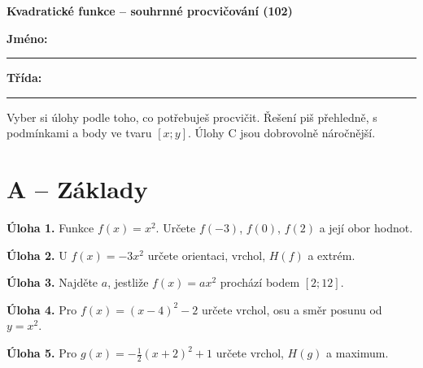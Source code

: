 \documentclass[11pt,a4paper]{article}
\begin{document}
\begin{center}{\Large\bfseries Kvadratické funkce – souhrnné procvičování (102)}\end{center}
\textbf{Jméno:}\ \rule{65mm}{0.4pt}\hfill\textbf{Třída:}\ \rule{25mm}{0.4pt}\par
Vyber si úlohy podle toho, co potřebuješ procvičit. Řešení piš přehledně, s podmínkami a body ve tvaru $[x;y]$. Úlohy C jsou dobrovolně náročnější.\par
\section*{A – Základy}
\noindent\textbf{Úloha 1.} Funkce $f(x)=x^2$. Určete $f(-3)$, $f(0)$, $f(2)$ a její obor hodnot.\par
\vspace{11mm}\par
\noindent\textbf{Úloha 2.} U $f(x)=-3x^2$ určete orientaci, vrchol, $H(f)$ a extrém.\par
\vspace{11mm}\par
\noindent\textbf{Úloha 3.} Najděte $a$, jestliže $f(x)=ax^2$ prochází bodem $[2;12]$.\par
\vspace{11mm}\par
\noindent\textbf{Úloha 4.} Pro $f(x)=(x-4)^2-2$ určete vrchol, osu a směr posunu od $y=x^2$.\par
\vspace{11mm}\par
\noindent\textbf{Úloha 5.} Pro $g(x)=-\frac12(x+2)^2+1$ určete vrchol, $H(g)$ a maximum.\par
\vspace{11mm}\par
\newpage
\end{document}
